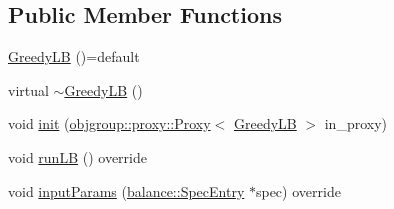 \subsection*{Public Member Functions}
\begin{DoxyCompactItemize}
\item 
\hyperlink{structvt_1_1vrt_1_1collection_1_1lb_1_1_greedy_l_b_a01292f5239d26023d8ff15bccfb9a501}{Greedy\+LB} ()=default
\item 
virtual \hyperlink{structvt_1_1vrt_1_1collection_1_1lb_1_1_greedy_l_b_a234935b9bb58ef4b7680be7540035c6f}{$\sim$\+Greedy\+LB} ()
\item 
void \hyperlink{structvt_1_1vrt_1_1collection_1_1lb_1_1_greedy_l_b_abfbe5625bf35d88c192aa46b83c4670a}{init} (\hyperlink{structvt_1_1objgroup_1_1proxy_1_1_proxy}{objgroup\+::proxy\+::\+Proxy}$<$ \hyperlink{structvt_1_1vrt_1_1collection_1_1lb_1_1_greedy_l_b}{Greedy\+LB} $>$ in\+\_\+proxy)
\item 
void \hyperlink{structvt_1_1vrt_1_1collection_1_1lb_1_1_greedy_l_b_ab5e726f6fe7aa749ea6e0e2a45171d36}{run\+LB} () override
\item 
void \hyperlink{structvt_1_1vrt_1_1collection_1_1lb_1_1_greedy_l_b_aec90a76fdcb1d57c9edfb6403bcc5181}{input\+Params} (\hyperlink{structvt_1_1vrt_1_1collection_1_1balance_1_1_spec_entry}{balance\+::\+Spec\+Entry} $\ast$spec) override
\end{DoxyCompactItemize}

